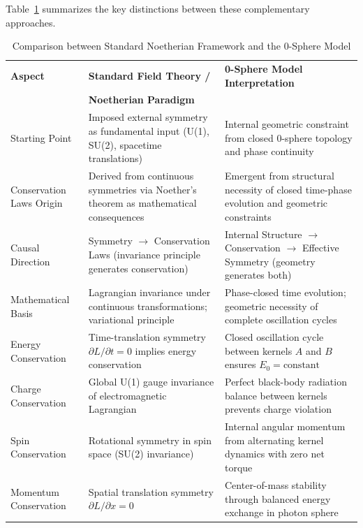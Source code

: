 \documentclass[%
 reprint,
 amsmath,amssymb,
 aps,
]{revtex4-1}
\numberwithin{equation}{section}%
\begin{document}
Table~\ref{tab:noether_comparison} summarizes the key distinctions between these complementary approaches.

\begin{table}[t!]
\caption{Comparison between Standard Noetherian Framework and the 0-Sphere Model}
\label{tab:noether_comparison}
\renewcommand{\arraystretch}{1.3}
\begin{tabular}{p{4.8cm}p{6.2cm}p{6.2cm}}
\toprule
\textbf{Aspect} & \textbf{Standard Field Theory /} & \textbf{0-Sphere Model Interpretation} \\
& \textbf{Noetherian Paradigm} & \\
\midrule
Starting Point & Imposed external symmetry as fundamental input (U(1), SU(2), spacetime translations) & Internal geometric constraint from closed 0-sphere topology and phase continuity \\
\addlinespace[0.3cm]
Conservation Laws Origin & Derived from continuous symmetries via Noether's theorem as mathematical consequences & Emergent from structural necessity of closed time-phase evolution and geometric constraints \\
\addlinespace[0.3cm]
Causal Direction & Symmetry $\rightarrow$ Conservation Laws (invariance principle generates conservation) & Internal Structure $\rightarrow$ Conservation $\rightarrow$ Effective Symmetry (geometry generates both) \\
\addlinespace[0.3cm]
Mathematical Basis & Lagrangian invariance under continuous transformations; variational principle & Phase-closed time evolution; geometric necessity of complete oscillation cycles \\
\addlinespace[0.3cm]
Energy Conservation & Time-translation symmetry $\partial L/\partial t = 0$ implies energy conservation & Closed oscillation cycle between kernels $A$ and $B$ ensures $E_0 = \text{constant}$ \\
\addlinespace[0.3cm]
Charge Conservation & Global U(1) gauge invariance of electromagnetic Lagrangian & Perfect black-body radiation balance between kernels prevents charge violation \\
\addlinespace[0.3cm]
Spin Conservation & Rotational symmetry in spin space (SU(2) invariance) & Internal angular momentum from alternating kernel dynamics with zero net torque \\
\addlinespace[0.3cm]
Momentum Conservation & Spatial translation symmetry $\partial L/\partial x = 0$ & Center-of-mass stability through balanced energy exchange in photon sphere \\

\end{tabular}
\end{table}
\end{document}
